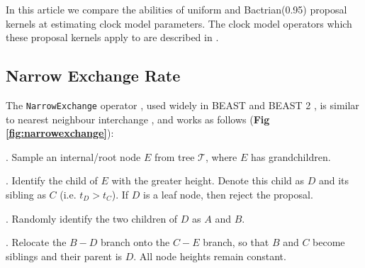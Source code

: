 \documentclass[10pt,letterpaper]{article}
\begin{document}
In this article we compare the abilities of uniform and Bactrian(0.95) proposal kernels at estimating clock model parameters. 
The clock model operators which these proposal kernels apply to are described in \textbf{}.









\clearpage
\subsection*{Narrow Exchange Rate} \label{sect:NER}

The \texttt{NarrowExchange} operator \cite{drummond2002estimating}, used widely in BEAST \cite{drummond2012bayesian,suchard2018bayesian} and BEAST 2 \cite{bouckaert2019beast}, is similar to nearest neighbour interchange \cite{semple2003phylogenetics}, and works as follows (\textbf{Fig \ref{fig:narrowexchange}}):

. Sample an internal/root node $E$ from tree $\mathcal{T}$, where $E$ has grandchildren.

. Identify the child of $E$ with the greater height. Denote this child as $D$ and its sibling as $C$ (i.e. $t_D > t_C$). If $D$ is a leaf node, then reject the proposal.

. Randomly identify the two children of $D$ as $A$ and $B$.

. Relocate the $B-D$ branch onto the $C-E$ branch, so that $B$ and $C$ become siblings and their parent is $D$. All node heights remain constant.
\end{document}
